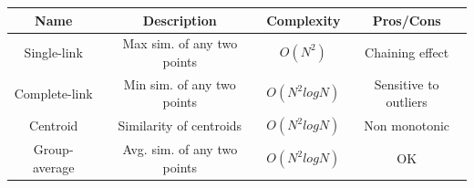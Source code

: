 \begin{center}
    \begin{tabular}{|c|c|c|c|}
     \hline
     \textbf{Name} & \textbf{Description} & \textbf{Complexity} & \textbf{Pros/Cons}\\
     \hline
     Single-link & Max sim. of any two points & $O(N^{2})$ & Chaining effect \\
     \hline
     Complete-link & Min sim. of any two points & $O(N^{2}logN)$ & Sensitive to outliers \\
     \hline
     Centroid & Similarity of centroids & $O(N^{2}logN)$ & Non monotonic \\
     \hline
     Group-average & Avg. sim. of any two points & $O(N^{2}logN)$ & OK\\
     \hline
\end{tabular}
\end{center}

